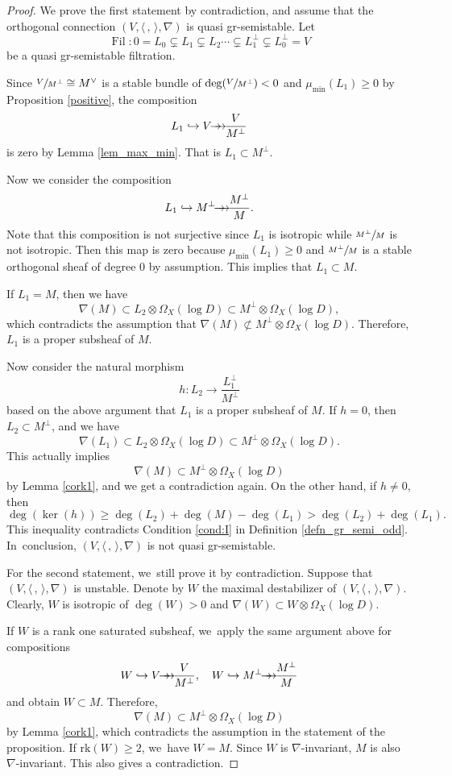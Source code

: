 \documentclass[JEP,XML,SOM,Unicode,published]{cedram}
\newcommand\hto{\mathrel{\lhook\joinrel\to}}
\newcommand{\onto}{\mathchoice{\to\hspace*{-5mm}\to}{\to\hspace*{-2.85mm}\to}{\to\hspace*{-3mm}\to}{\to\hspace*{-3mm}\to}}
\newcommand{\grsemistable}{gr\nobreakdash-semi\-stable\xspace}
\DeclareMathOperator{\Filt}{Fil}
\newcommand{\rk}{\mathrm{rk}}
\theoremstyle{plain}
\theoremstyle{definition}
\begin{document}
\begin{proof}
We prove the first statement by contradiction, and assume that the orthogonal connection $(V,\langle \,, \, \rangle,\nabla)$ is quasi \grsemistable. Let
\[
\Filt: 0= L_0 \subsetneq L_1 \subsetneq L_2 \cdots \subsetneq L_1^\perp\subsetneq L_0^\perp= V
\]
be a quasi \grsemistable filtration.

Since $\sfrac{V}{M^\perp}\cong M^\vee$ is a stable bundle of $\deg(\sfrac{V}{M^\perp})<0$ and $\mu_{\min}(L_1)\geq 0$ by Proposition \ref{positive}, the composition
\[
L_1\hto V\onto \frac{V}{M^\perp}
\]
is zero by Lemma \ref{lem_max_min}. That is $L_1\subset M^\perp$.

Now we consider the composition
\[
L_1\hto M^\perp\onto \frac{M^\perp}{M}.
\]
Note that this composition is not surjective since $L_1$ is isotropic while $\sfrac{M^\perp}{M}$ is not isotropic. Then this map is zero because $\mu_{\min}(L_1)\geq 0$ and $\sfrac{M^\perp}{M}$ is a stable orthogonal sheaf of degree $0$ by assumption. This implies that $L_1\subset M$.

If $L_1=M$, then we have
\[
\nabla(M)\subset L_2\otimes \Omega_X(\log D)\subset M^\perp\otimes \Omega_X(\log D),
\]
which contradicts the assumption that $\nabla(M)\not \subset M^\perp\otimes\Omega_X(\log D)$. Therefore, $L_1$ is a proper subsheaf of $M$.

Now consider the natural morphism
\[
h: L_2\to \frac{L_1^\perp}{M^\perp}
\]
based on the above argument that $L_1$ is a proper subsheaf of $M$. If $h=0$, then $L_2\subset M^\perp$, and we have
\[
\nabla(L_1)\subset L_2\otimes \Omega_X(\log D)\subset M^\perp\otimes \Omega_X(\log D).
\]
This actually implies
\[
\nabla(M) \subset M^\perp\otimes\Omega_X(\log D)
\]
by Lemma \ref{cork1}, and we get a contradiction again. On the other hand, if $h\neq 0$, then
\[
\deg(\ker(h))\geq \deg(L_2)+\deg(M)-\deg(L_1)> \deg(L_2)+\deg(L_1).
\]
This inequality contradicts Condition \eqref{cond:I} in Definition \ref{defn_gr_semi_odd}. In~conclusion, $(V, \langle \,, \, \rangle, \nabla)$ is not quasi \grsemistable.

For the second statement, we~still prove it by contradiction. Suppose that $(V, \langle \,, \, \rangle, \nabla)$ is unstable. Denote by $W$ the maximal destabilizer of $(V, \langle \,, \, \rangle, \nabla)$. Clearly, $W$ is isotropic of $\deg(W)>0$ and $\nabla(W)\subset W\otimes \Omega_X(\log D)$.

If $W$ is a rank one saturated subsheaf, we~apply the same argument above for compositions
\begin{align*}
W \hto V \onto \frac{V}{M^{\perp}}, \quad W \hto M^\perp\onto \frac{M^\perp}{M}
\end{align*}
and obtain $W \subset M$. Therefore,
\[
\nabla(M)\subset M^\perp\otimes\Omega_X(\log D)
\]
by Lemma \ref{cork1}, which contradicts the assumption in the statement of the proposition. If $\rk(W)\geq 2$, we~have $W= M$. Since $W$ is $\nabla$-invariant, $M$ is also $\nabla$-invariant. This also gives a contradiction.


\end{proof}
\end{document}
